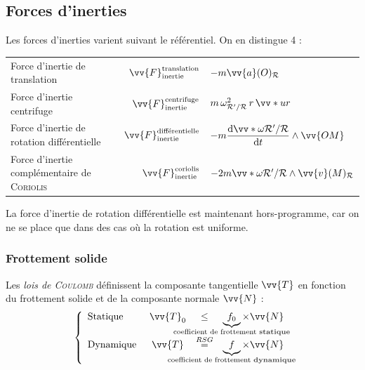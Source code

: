 \documentclass[11pt,a4paper,fleqn,pdftex]{report}
\begin{document}
\subsection{Forces d'inerties} %
\label{sub:forces_d_inerties}
Les forces d'inerties varient suivant le référentiel. On en distingue 4 : \\[0.8\baselineskip]
\renewcommand\arraystretch{2} \setlength\minrowclearance{2pt}
\begin{tabular}{|b r@{$\: = \: $}l|}\hline
  Force d'inertie de translation & $\vv{F}_\text{inertie}^{\text{translation}}$&$-m\vv{a}(O)_{\mathcal{R}} $ \\
  Force d'inertie centrifuge & $\vv{F}_\text{inertie}^{\text{centrifuge}} $&$ m\, \omega^2_{\mathcal{R'}/\mathcal{R}} \, r \, \vv*{u}{r} $\\
  Force d'inertie de rotation différentielle & $\vv{F}_\text{inertie}^{\text{différentielle}}$ & $-m \dfrac{\d \vv*{\omega}{\mathcal{R'}/\mathcal{R}}}{\d t} \wedge \vv{OM} $ \\
  Force d'inertie complémentaire de \textsc{Coriolis}\index{Force!Coriolis@\emphi{de }\textsc{Coriolis}} & $\vv{F}_\text{inertie}^{\text{coriolis}}$&$ -2 m \vv*{\omega}{\mathcal{R'}/\mathcal{R}} \wedge \vv{v}(M)_\mathcal{R} $\\
  \hline
\end{tabular}
 La force d'inertie de rotation différentielle est maintenant hors-programme, car on ne se place que dans des cas où la rotation est uniforme. 
\subsubsection{Frottement solide} %
\label{ssub:frottement_solide}
\begin{itheorem}
   Les \emph{lois de \textsc{Coulomb}} définissent la composante tangentielle $\vv{T}$ en fonction du frottement solide et de la composante normale $\vv{N}$ : \\
    \begin{equation}\label{Lois de Coulomb}
      \left\lbrace
      \begin{array}{l c c l}
      \text{Statique }&\vv{T}_0&\le & \underbrace{f_0}_{\mathclap{\text{coefficient de frottement \emphh{statique}}}}\times\vv{N}\\
      \text{Dynamique }&\vv{T}&\overset{RSG}{=}&\underbrace{f}_{\mathclap{\text{coefficient de frottement \emphh{dynamique}}}}\times\vv{N}\\
      \end{array}
      \right.
    \end{equation}
\end{itheorem}
\end{document}
